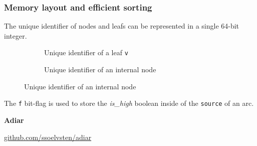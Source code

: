 \documentclass[english, aspectratio=169]{beamer}
\begin{document}
\begin{frame}
  \frametitle{Memory layout and efficient sorting}

  The unique identifier of nodes and leafs can be represented in a single 64-bit
  integer.
  
  \begin{figure}
  \begin{subfigure}[b]{0.49\linewidth}
    \centering

    \begin{tikzpicture}
      
    \end{tikzpicture}

    \caption{Unique identifier of a leaf \texttt{v}}
  \end{subfigure}
  \begin{subfigure}[b]{0.49\linewidth}
    \centering

    \begin{tikzpicture}
      
    \end{tikzpicture}
    
    \caption{Unique identifier of an internal node}
  \end{subfigure}
  \end{figure}

  The \texttt{f} bit-flag is used to store the \emph{is\_high} boolean inside of
  the \texttt{source} of an arc.
  
\end{frame}

\begin{frame}{} %
  \pause

  \begin{center}
    {\Huge \textbf{Adiar}}

    \vspace{12pt}
    
    \textcolor{gray}{\small
      \href{http://github.com/ssoelvsten/adiar}{github.com/ssoelvsten/adiar}
    }
  \end{center}
\end{frame}
\end{document}

